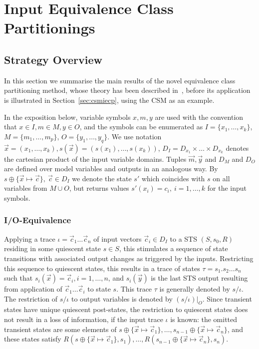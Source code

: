 
\newpage\section{Input Equivalence Class Partitionings}\label{sec:iecpstart}

\subsection{Strategy Overview}\label{sec:strategyoverview}
In this section we summarise the main results of the novel equivalence class partitioning method, whose theory has been described in~\cite{peleska2013ictss}, before its application is illustrated in Section~\ref{sec:csmiecp}, using the CSM as an example.


In the exposition below, variable symbols $x,m,y$ are used with the convention that $x\in I, m\in M, y \in O$, and the symbols can be enumerated as  $I = \{ x_1,\dots,x_k\}$, $M = \{m_1,\dots, m_p\}$, $O = \{y_1,\dots,y_q\}$. We use   notation
$\vec x = (x_1,\dots,x_k), s(\vec x) = (s(x_1),\dots,s(x_k))$, $D_I = D_{x_1}\times\dots\times D_{x_k}$ denotes the cartesian product of the input variable domains. Tuples $\vec m, \vec y$ and $D_M$ and $D_O$ are defined over model variables and outputs in an analogous way. By $s\oplus\{\vec x \mapsto \vec c\}, \ \vec c \in D_I$ we denote the state $s'$ which coincides with $s$ on all variables from $M\cup O$, but returns values $s'(x_i) = c_i,\ i = 1,\dots,k$ for the input symbols. 

\subsubsection{I/O-Equivalence}\label{sec:ioequiv}

Applying a trace $\iota = \vec c_1\dots\vec c_n$ 
of input vectors $\vec c_i\in D_I$ to a STS $(S,s_0,R)$  residing in some quiescent state
$s\in S$, this stimulates a sequence of state transitions with associated  output changes  
as triggered by the inputs. Restricting this   sequence to quiescent states, this results in
a trace of states
$\tau = s_1.s_2\dots s_n$ such that $s_i(\vec x) = \vec c_i, i = 1,\dots,n$, and
$s_i(\vec y)$ is the last STS output resulting from application of $\vec c_1\dots\vec c_i$ 
to state $s$. This trace $\tau$ is generally denoted by $s/\iota$. The restriction of $s/\iota$ to output variables is denoted by $(s/\iota)|_O$.
Since transient states have unique quiescent post-states, the restriction to quiescent states does not result in a loss of information, if the input trace $\iota$ is known: the omitted transient states are some elements of $s\oplus\{\vec x \mapsto \vec c_1\},\dots,
s_{n-1}\oplus\{\vec x \mapsto \vec c_n\}$, and these states satisfy $R(s\oplus\{\vec x \mapsto \vec c_1\},s_1),\dots,R(s_{n-1}\oplus\{\vec x \mapsto \vec c_n\},s_n)$.

